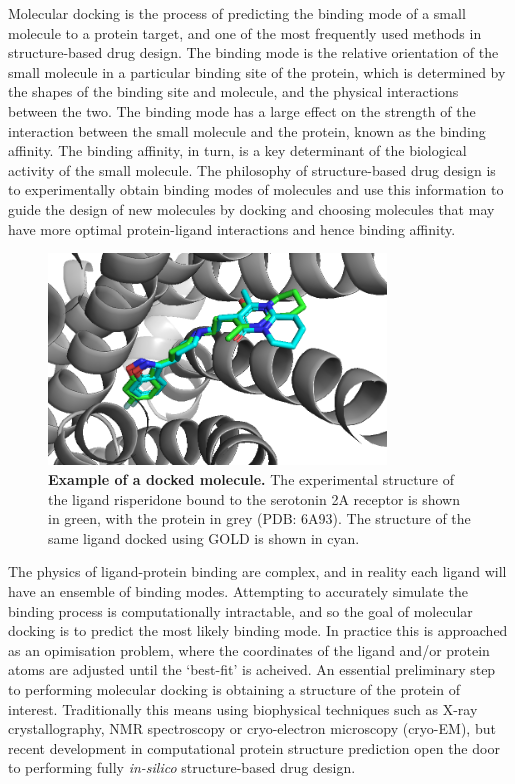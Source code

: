 Molecular docking is the process of predicting the binding mode of a small molecule to a protein target, and one of the most frequently used methods in structure-based drug design. \cite{meng2011molecular, Kitchen2004Docking} The binding mode is the relative orientation of the small molecule in a particular binding site of the protein, which is determined by the shapes of the binding site and molecule, and the physical interactions between the two. The binding mode has a large effect on the strength of the interaction between the small molecule and the protein, known as the binding affinity. The binding affinity, in turn, is a key determinant of the biological activity of the small molecule. The philosophy of structure-based drug design is to experimentally obtain binding modes of molecules and use this information to guide the design of new molecules by docking and choosing molecules that may have more optimal protein-ligand interactions and hence binding affinity.

\begin{figure}[!h]
    \centering
    \includegraphics[width=0.8\textwidth]{Chapters/Background/Figs/docked_6a93.png}
    \caption{\label{fig:docked} \textbf{Example of a docked molecule.} The experimental structure of the ligand risperidone bound to the serotonin 2A receptor is shown in green, with the protein in grey (PDB: 6A93). The structure of the same ligand docked using GOLD is shown in cyan.}
\end{figure}

The physics of ligand-protein binding are complex, and in reality each ligand will have an ensemble of binding modes. Attempting to accurately simulate the binding process is computationally intractable, and so the goal of molecular docking is to predict the most likely binding mode. In practice this is approached as an opimisation problem, where the coordinates of the ligand and/or protein atoms are adjusted until the `best-fit' is acheived. An essential preliminary step to performing molecular docking is obtaining a structure of the protein of interest. Traditionally this means using biophysical techniques such as X-ray crystallography, NMR spectroscopy or cryo-electron microscopy (cryo-EM), but recent development in computational protein structure prediction \cite{Jumper2021AlphaFold, Wong2022AF2Docking} open the door to performing fully \textit{in-silico} structure-based drug design.

